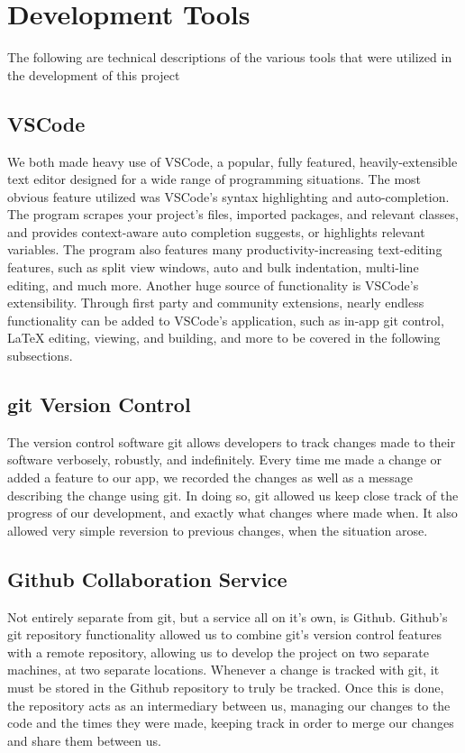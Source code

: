 \documentclass[sigconf]{acmart}
\begin{document}

\maketitle

\section{Development Tools}

The following are technical descriptions of the various tools that were utilized in the development of this project

\subsection{VSCode}
We both made heavy use of VSCode, a popular, fully featured, heavily-extensible text editor designed for a wide range of programming situations. The most obvious feature utilized was VSCode's syntax highlighting and auto-completion. The program scrapes your project's files, imported packages, and relevant classes, and provides context-aware auto completion suggests, or highlights relevant variables. The program also features many productivity-increasing text-editing features, such as split view windows, auto and bulk indentation, multi-line editing, and much more. Another huge source of functionality is VSCode's extensibility. Through first party and community extensions, nearly endless functionality can be added to VSCode's application, such as in-app git control, LaTeX editing, viewing, and building, and more to be covered in the following subsections.

\subsection{git Version Control}
The version control software git allows developers to track changes made to their software verbosely, robustly, and indefinitely. Every time me made a change or added a feature to our app, we recorded the changes as well as a message describing the change using git. In doing so, git allowed us keep close track of the progress of our development, and exactly what changes where made when. It also allowed very simple reversion to previous changes, when the situation arose.

\subsection{Github Collaboration Service}
Not entirely separate from git, but a service all on it's own, is Github. Github's git repository functionality allowed us to combine git's version control features with a remote repository, allowing us to develop the project on two separate machines, at two separate locations. Whenever a change is tracked with git, it must be stored in the Github repository to truly be tracked. Once this is done, the repository acts as an intermediary between us, managing our changes to the code and the times they were made, keeping track in order to merge our changes and share them between us. 
\end{document}
